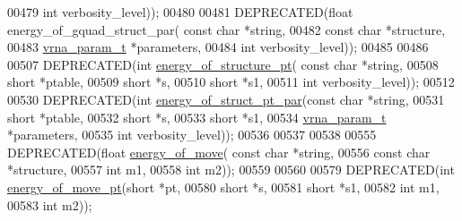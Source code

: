 \begin{DoxyCode}
00479                                 \textcolor{keywordtype}{int} verbosity\_level));
00480 
00481 DEPRECATED(\textcolor{keywordtype}{float} energy\_of\_gquad\_struct\_par( \textcolor{keyword}{const} \textcolor{keywordtype}{char} *\textcolor{keywordtype}{string},
00482                                   \textcolor{keyword}{const} \textcolor{keywordtype}{char} *structure,
00483                                   \hyperlink{group__energy__parameters_structvrna__param__s}{vrna\_param\_t} *parameters,
00484                                   \textcolor{keywordtype}{int} verbosity\_level));
00485 
00486 
00507 DEPRECATED(\textcolor{keywordtype}{int} \hyperlink{eval_8h_a8831445966b761417e713360791299d8}{energy\_of\_structure\_pt}( \textcolor{keyword}{const} \textcolor{keywordtype}{char} *\textcolor{keywordtype}{string},
00508                             \textcolor{keywordtype}{short} *ptable,
00509                             \textcolor{keywordtype}{short} *s,
00510                             \textcolor{keywordtype}{short} *s1,
00511                             \textcolor{keywordtype}{int} verbosity\_level));
00512 
00530 DEPRECATED(\textcolor{keywordtype}{int} \hyperlink{eval_8h_a49acb3d5627dc6823a7ce12d116d4c69}{energy\_of\_struct\_pt\_par}(\textcolor{keyword}{const} \textcolor{keywordtype}{char} *\textcolor{keywordtype}{string},
00531                             \textcolor{keywordtype}{short} *ptable,
00532                             \textcolor{keywordtype}{short} *s,
00533                             \textcolor{keywordtype}{short} *s1,
00534                             \hyperlink{group__energy__parameters_structvrna__param__s}{vrna\_param\_t} *parameters,
00535                             \textcolor{keywordtype}{int} verbosity\_level));
00536 
00537 
00538 
00555 DEPRECATED(\textcolor{keywordtype}{float} \hyperlink{eval_8h_a539ecaed89730f7644c202f304d7529b}{energy\_of\_move}( \textcolor{keyword}{const} \textcolor{keywordtype}{char} *\textcolor{keywordtype}{string},
00556                       \textcolor{keyword}{const} \textcolor{keywordtype}{char} *structure,
00557                       \textcolor{keywordtype}{int} m1,
00558                       \textcolor{keywordtype}{int} m2));
00559 
00560 
00579 DEPRECATED(\textcolor{keywordtype}{int} \hyperlink{eval_8h_a49e0ee561be69faf0568213546f6a53f}{energy\_of\_move\_pt}(\textcolor{keywordtype}{short} *pt,
00580                    \textcolor{keywordtype}{short} *s,
00581                    \textcolor{keywordtype}{short} *s1,
00582                    \textcolor{keywordtype}{int} m1,
00583                    \textcolor{keywordtype}{int} m2));

\end{DoxyCode}
